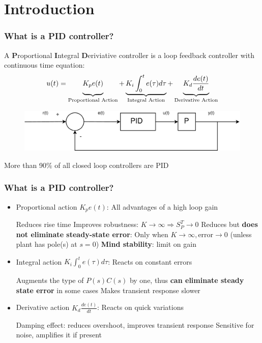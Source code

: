 


\section{Introduction}

\begin{frame}
	\frametitle{What is a PID controller?}
	\begin{definition}
		A \textbf{P}roportional \textbf{I}ntegral \textbf{D}eriviative controller is a loop feedback controller with continuous time equation:
		\begin{equation*}
			u(t) = 	\underbrace{\vphantom{\int^t_0e(\tau)d\tau}K_p e(t)}_\text{Proportional Action} 
					+ \underbrace{K_i\int^t_0e(\tau)d\tau}_\text{Integral Action} 
					+ \underbrace{\vphantom{\int^t_0e(\tau)d\tau} K_d \frac{de(t)}{dt}}_\text{Derivative Action}
		\end{equation*}
		\begin{figure}
			\centering
			\includegraphics[width=0.8\linewidth]{img/PID}
		\end{figure}
	\end{definition}
	More than 90\% of all closed loop controllers are PID
\end{frame}

\begin{frame}
	\frametitle{What is a PID controller?}
	\begin{itemize}
		\item Proportional action $K_p e(t)$: All advantages of a high loop gain
			\begin{itemize}
				\pro Reduces rise time
				\pro Improves robustness: $K \rightarrow \infty \Rightarrow S^T_P \rightarrow 0$
				\con Reduces but \textbf{does not eliminate steady-state error}: Only when $K \rightarrow \infty , \text{error} \rightarrow 0$
				 (unless plant has pole(s) at $s=0$)
				\con \textbf{Mind stability}: limit on gain
			\end{itemize}
		\pause
		\item Integral action $K_i\int_0^t e(\tau)d\tau$: Reacts on constant errors
			\begin{itemize}
				\pro Augments the type of $P(s)C(s)$ by one, thus \textbf{can eliminate steady state error} in some cases
				\con Makes transient response slower 
			\end{itemize}
		\pause
		\item Derivative action $K_d \frac{de(t)}{dt}$: Reacts on quick variations
		\begin{itemize}
			\pro Damping effect: reduces overshoot, improves transient response
			\con Sensitive for noise, amplifies it if present
		\end{itemize}
	\end{itemize}
\end{frame}


